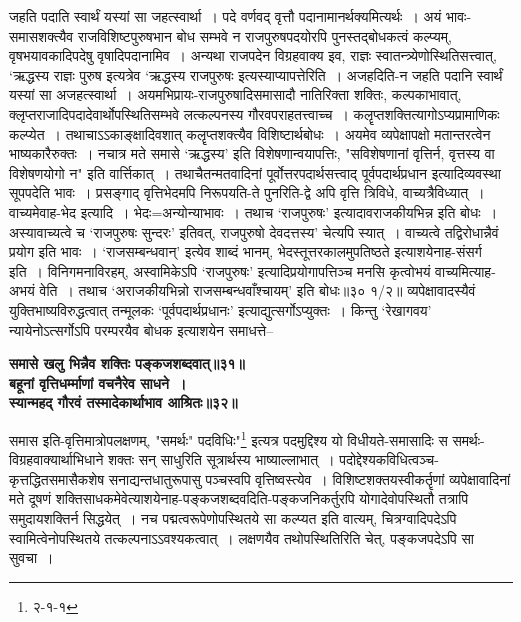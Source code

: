 {{{{ जहति पदाति स्वार्थं यस्यां सा जहत्स्वार्था~।
पदे वर्णवद् वृत्तौ पदानामानर्थक्यमित्यर्थः~।
अयं भावः-समासशक्त्यैव राजविशिष्टपुरुषभान {बोध} सम्भवे न राजपुरुषपदयोरपि पुनस्तद्बोधकत्वं कल्प्यम्, वृषभयावकादिपदेषु वृषादिपदानामिव~।
 अन्यथा राजपदेन विग्रहवाक्य इव, राज्ञः स्वातन्त्र्येणोस्थितिसत्त्वात्, `ऋद्धस्य राज्ञः पुरुष इत्यत्रेव `ऋद्धस्य राजपुरुषः इत्यस्याप्यापत्तेरिति~।
 अजहदिति-न जहति पदानि स्वार्थं यस्यां सा अजहत्स्वार्था~।
 अयमभिप्रायः-राजपुरुषादिसमासादौ नातिरिक्ता शक्तिः, कल्पकाभावात्, क्लृप्तराजादिपदादेवार्थोपस्थितिसम्भवे लत्कल्पनस्य गौरवपराहतत्त्वाच्च~।
कलॄप्तशक्तित्यागोऽप्यप्रामाणिकः कल्प्येत~।
तथाचाऽऽकाङ्क्षादिवशात् कलॄप्तशक्त्यैव विशिष्टार्थबोधः~।
 अयमेव व्यपेक्षापक्षो मतान्तरत्वेन भाष्यकारैरुक्तः~।
 नचात्र मते समासे `ऋद्धस्य' इति विशेषणान्वयापत्तिः, "सविशेषणानां वृत्तिर्न, वृत्तस्य वा विशेषणयोगो न" इति वार्त्तिकात्~।
तथाचैतन्मतवादिनां पूर्वोत्तरपदार्थसत्त्वाद् पूर्वपदार्थप्रधान इत्यादिव्यवस्था सूपपदेति भावः~।
 प्रसङ्गाद् वृत्तिभेदमपि निरूपयति-ते पुनरिति-द्वे अपि वृत्ति त्रिविधे, वाच्यत्रैविध्यात्~।
वाच्यमेवाह-भेद इत्यादि~।
भेदः=अन्योन्याभावः~।
तथाच `राजपुरुषः' इत्यादावराजकीयभिन्न इति बोधः~।
अस्यावाच्यत्वे च `राजपुरुषः सुन्दरः' इतिवत्, राजपुरुषो देवदत्तस्य' चेत्यपि स्यात्~।
वाच्यत्वे तद्विरोधान्नैवं प्रयोग इति भावः~।
 `राजसम्बन्धवान्' इत्येव शाब्दं भानम्, भेदस्तूत्तरकालमुपतिष्ठते इत्याशयेनाह-संसर्ग इति~।
विनिगमनाविरहम्, अस्वामिकेऽपि `राजपुरुषः' इत्यादिप्रयोगापत्तिञ्च मनसि कृत्वोभयं वाच्यमित्याह-अभयं वेति~।
तथाच `अराजकीयभिन्नो राजसम्बन्धवाँश्चायम्' इति बोधः॥३० १/२॥
 व्यपेक्षावादस्यैवं युक्तिभाष्यविरुद्धत्वात् तन्मूलकः `पूर्वपदार्थप्रधानः' इत्याद्युत्सर्गोऽप्युक्तः~।
किन्तु `रेखागवय' न्यायेनोऽत्सर्गोऽपि परम्परयैव बोधक इत्याशयेन समाधत्ते--
\begin{center}{\bfseries समासे खलु भिन्नैव शक्तिः पङ्कजशब्दवात्॥३१॥\\[10pt]
 बहूनां वृत्तिधर्म्माणां वचनैरेव साधने~।\\
 स्यान्महद् गौरवं तस्मादेकार्थाभाव आश्रितः॥३२॥}\end{center}
 समास इति-वृत्तिमात्रोपलक्षणम्, "समर्थः" पदविधिः"\footnote{२-१-१} इत्यत्र पदमुद्दिश्य यो विधीयते-समासादिः स समर्थः-विग्रहवाक्यार्थाभिधाने शक्तः सन् साधुरिति सूत्रार्थस्य भाष्याल्लाभात्~।
 पदोद्देश्यकविधित्वञ्च-कृत्तद्धितसमासैकशेष सनाद्यन्तधातुरूपासु पञ्चस्वपि वृत्तिष्वस्त्येव~।
विशिष्टशक्तयस्वीकर्तॄणां व्यपेक्षावादिनां मते दूषणं शक्तिसाधकमेवेत्याशयेनाह-पङ्कजशब्दवदिति-पङ्कजनिकर्तुरपि योगादेवोपस्थितौ तत्रापि समुदायशक्तिर्न सिद्धयेत्~। 
 नच पद्मत्वरूपेणोपस्थितये सा कल्प्यत इति वात्यम्, चित्रग्वादिपदेऽपि स्वामित्वेनोपस्थितये तत्कल्पनाऽऽवश्यकत्वात्~।
लक्षणयैव तथोपस्थितिरिति चेत्, पङ्कजपदेऽपि सा सुवचा~।
}}}}
